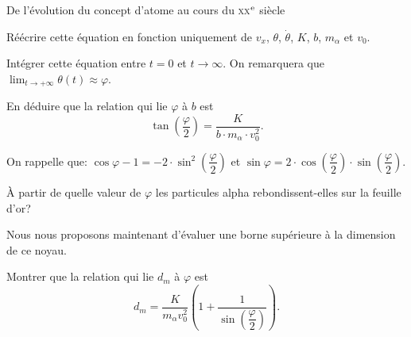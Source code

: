 \begin{exo}[PC][1][devoir]{De l'évolution du concept d'atome au cours du \textsc{xx}$^{\rm e}$ siècle}
\begin{quest}
Réécrire cette équation en fonction uniquement de $v_{x}$, $\theta$,
$\dot{\theta}$, $K$, $b$, $m_{\alpha}$ et $v_{0}$.


Intégrer cette équation entre $t=0$ et $t\rightarrow\infty$. On
remarquera que $\lim_{t\rightarrow+\infty}\theta(t)\approx\varphi$.


En déduire que la relation qui lie $\varphi$ à $b$ est
$$\tan\left(\dfrac{\varphi}{2}\right)=\dfrac{K}{b\cdot m_{\alpha}\cdot v_{0}^{2}}.$$


\end{quest}
On rappelle que: $\cos\varphi-1=-2\cdot\sin^{2}\left(\dfrac{\varphi}{2}\right)$
et $\sin\varphi=2\cdot\cos\left(\dfrac{\varphi}{2}\right)\cdot\sin\left(\dfrac{\varphi}{2}\right)$.
\begin{quest}
\item  À partir de quelle valeur de $\varphi$ les particules alpha rebondissent-elles
sur la feuille d'or?
\end{quest}
Nous nous proposons maintenant d'évaluer une borne supérieure à la
dimension de ce noyau.
\begin{quest}
\item  Montrer que la relation qui lie $d_{m}$ à $\varphi$ est
$$d_{m}=\dfrac{K}{m_{\alpha}v_{0}^{2}}\left(1+\dfrac{1}{\sin\left(\dfrac{\varphi}{2}\right)}\right).$$


\end{quest}
\end{exo}
